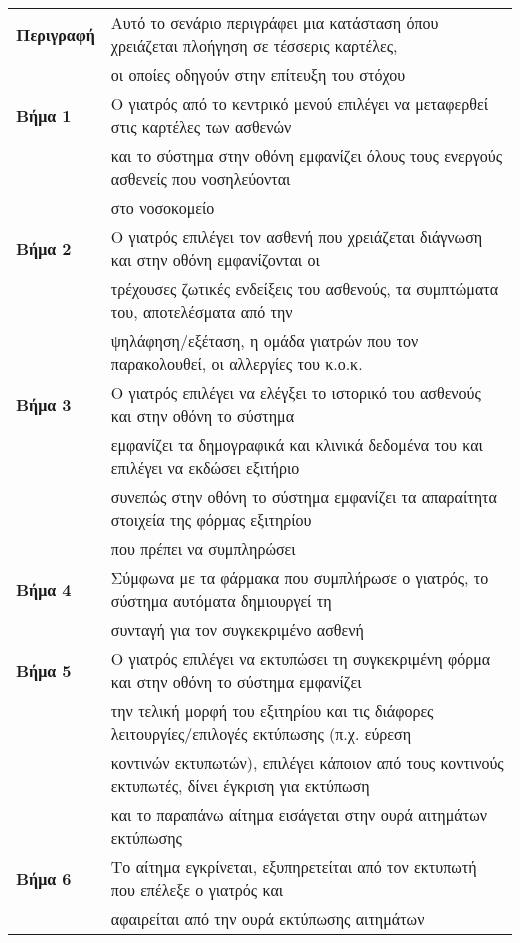 \documentclass{article}
\newcommand\T{\rule{0pt}{2.6ex}}       %
\newcommand\B{\rule[-1.2ex]{0pt}{0pt}}
\begin{document}
 \begin{center}
     \begin{tabular}{|l|l|}
     \hline
      \textbf{Περιγραφή} & Αυτό το σενάριο περιγράφει μια κατάσταση όπου χρειάζεται πλοήγηση σε τέσσερις καρτέλες, \T \\& οι οποίες οδηγούν στην επίτευξη του στόχου \B \\ 
      \hline
      \textbf{Βήμα 1} & Ο γιατρός από το κεντρικό μενού επιλέγει να μεταφερθεί στις  καρτέλες των ασθενών \T \\& και το σύστημα στην οθόνη εμφανίζει όλους τους ενεργούς ασθενείς   που νοσηλεύονται \\& στο νοσοκομείο \B \\
      \hline
      \textbf{Βήμα 2} & Ο γιατρός επιλέγει τον ασθενή που χρειάζεται διάγνωση και στην οθόνη εμφανίζονται οι \T \\& τρέχουσες ζωτικές ενδείξεις του ασθενούς,  τα συμπτώματα του, αποτελέσματα από την \\& ψηλάφηση/εξέταση, η ομάδα γιατρών  που τον παρακολουθεί, οι αλλεργίες του κ.ο.κ. \B \\
      \hline
      \textbf{Βήμα 3} & Ο γιατρός επιλέγει να ελέγξει το ιστορικό του ασθενούς και στην οθόνη το σύστημα \T \\& εμφανίζει τα δημογραφικά και κλινικά δεδομένα του και επιλέγει να εκδώσει εξιτήριο \\& συνεπώς στην οθόνη το σύστημα εμφανίζει τα απαραίτητα στοιχεία της φόρμας εξιτηρίου \\& που πρέπει να συμπληρώσει  \B \\
      \hline
      \textbf{Βήμα 4} & Σύμφωνα με τα φάρμακα που συμπλήρωσε ο γιατρός, το σύστημα αυτόματα δημιουργεί τη \T \\& συνταγή για τον συγκεκριμένο ασθενή \B \\
      \hline
      \textbf{Βήμα 5} & Ο γιατρός επιλέγει να εκτυπώσει τη συγκεκριμένη φόρμα και στην οθόνη το σύστημα εμφανίζει \T \\& την τελική μορφή του εξιτηρίου και τις διάφορες λειτουργίες/επιλογές εκτύπωσης (π.χ. εύρεση \\& κοντινών εκτυπωτών), επιλέγει κάποιον από τους κοντινούς εκτυπωτές, δίνει έγκριση για εκτύπωση  \\& και το παραπάνω αίτημα εισάγεται στην ουρά αιτημάτων εκτύπωσης \B \\
      \hline
      \textbf{Βήμα 6} & Το αίτημα εγκρίνεται, εξυπηρετείται από τον εκτυπωτή που επέλεξε ο γιατρός και \T \\& αφαιρείται από την ουρά εκτύπωσης αιτημάτων \B \\

\end{tabular}
\end{center}
\end{document}
